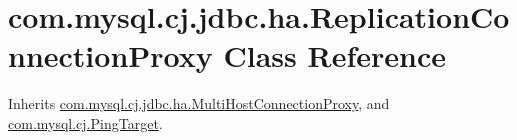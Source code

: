 \hypertarget{classcom_1_1mysql_1_1cj_1_1jdbc_1_1ha_1_1_replication_connection_proxy}{}\section{com.\+mysql.\+cj.\+jdbc.\+ha.\+Replication\+Connection\+Proxy Class Reference}
\label{classcom_1_1mysql_1_1cj_1_1jdbc_1_1ha_1_1_replication_connection_proxy}


Inherits \mbox{\hyperlink{classcom_1_1mysql_1_1cj_1_1jdbc_1_1ha_1_1_multi_host_connection_proxy}{com.\+mysql.\+cj.\+jdbc.\+ha.\+Multi\+Host\+Connection\+Proxy}}, and \mbox{\hyperlink{interfacecom_1_1mysql_1_1cj_1_1_ping_target}{com.\+mysql.\+cj.\+Ping\+Target}}.


